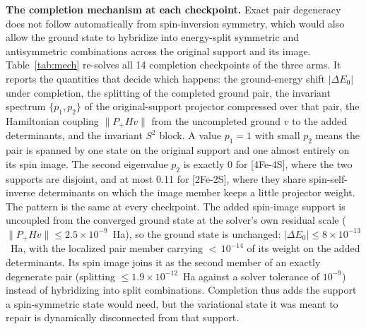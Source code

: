 \documentclass[11pt]{article}
\begin{document}
\textbf{The completion mechanism at each checkpoint.} Exact pair degeneracy does not follow automatically from spin-inversion symmetry, which would also allow the ground state to hybridize into energy-split symmetric and antisymmetric combinations across the original support and its image. Table~\ref{tab:mech} re-solves all 14 completion checkpoints of the three arms. It reports the quantities that decide which happens: the ground-energy shift $|\Delta E_0|$ under completion, the splitting of the completed ground pair, the invariant spectrum $\{p_1, p_2\}$ of the original-support projector compressed over that pair, the Hamiltonian coupling $\|P_+ H v\|$ from the uncompleted ground $v$ to the added determinants, and the invariant $S^2$ block. A value $p_1 = 1$ with small $p_2$ means the pair is spanned by one state on the original support and one almost entirely on its spin image. The second eigenvalue $p_2$ is exactly 0 for [4Fe-4S], where the two supports are disjoint, and at most 0.11 for [2Fe-2S], where they share spin-self-inverse determinants on which the image member keeps a little projector weight. The pattern is the same at every checkpoint. The added spin-image support is uncoupled from the converged ground state at the solver's own residual scale ($\|P_+ H v\| \le 2.5\times10^{-9}$~Ha), so the ground state is unchanged: $|\Delta E_0| \le 8\times10^{-13}$~Ha, with the localized pair member carrying ${<}\,10^{-14}$ of its weight on the added determinants. Its spin image joins it as the second member of an exactly degenerate pair (splitting $\le 1.9\times10^{-12}$~Ha against a solver tolerance of $10^{-9}$) instead of hybridizing into split combinations. Completion thus adds the support a spin-symmetric state would need, but the variational state it was meant to repair is dynamically disconnected from that support.
\end{document}
